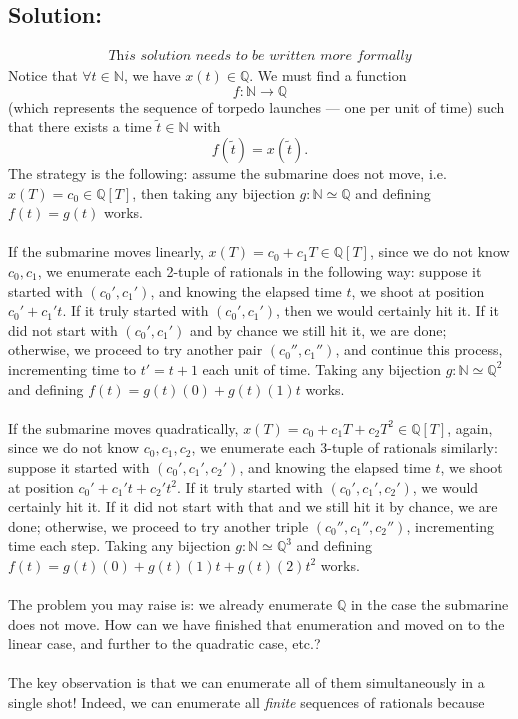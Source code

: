\documentclass[11pt, a4paper, oneside]{article}
\newcommand{\solution}[1][]{\subsection*{#1}\hfill \par}
\theoremstyle{remark}
\theoremstyle{lemma}
\begin{document}
\solution[Solution:]
\[
\substack{\textit{This solution needs to be written more formally}}
\]
Notice that \(\forall t \in \mathbb{N}\), we have \(x(t) \in \mathbb{Q}\). We must find a function
\[
f: \mathbb{N} \rightarrow \mathbb{Q}
\]
(which represents the sequence of torpedo launches — one per unit of time) such that there exists a time \(\tilde{t} \in \mathbb{N}\) with
\[
f(\tilde{t}) = x(\tilde{t}).
\]
The strategy is the following: assume the submarine does not move, i.e. \(x(T) = c_0 \in \mathbb{Q}[T]\), then taking any bijection \(g: \mathbb{N} \simeq \mathbb{Q}\) and defining \(f(t) = g(t)\) works.
\\\\
If the submarine moves linearly, \(x(T) = c_0 + c_1 T \in \mathbb{Q}[T]\), since we do not know \(c_0, c_1\), we enumerate each 2-tuple of rationals in the following way: suppose it started with \((c_0', c_1')\), and knowing the elapsed time \(t\), we shoot at position \(c_0' + c_1' t\). If it truly started with \((c_0', c_1')\), then we would certainly hit it. If it did not start with \((c_0', c_1')\) and by chance we still hit it, we are done; otherwise, we proceed to try another pair \((c_0'', c_1'')\), and continue this process, incrementing time to \(t' = t + 1\) each unit of time. Taking any bijection \(g: \mathbb{N} \simeq \mathbb{Q}^{2}\) and defining \(f(t) = g(t)(0)+g(t)(1)t\) works.
\\\\
If the submarine moves quadratically, \(x(T) = c_0 + c_1 T + c_2 T^2 \in \mathbb{Q}[T]\), again, since we do not know \(c_0, c_1, c_2\), we enumerate each 3-tuple of rationals similarly: suppose it started with \((c_0', c_1', c_2')\), and knowing the elapsed time \(t\), we shoot at position \(c_0' + c_1' t + c_2' t^2\). If it truly started with \((c_0', c_1', c_2')\), we would certainly hit it. If it did not start with that and we still hit it by chance, we are done; otherwise, we proceed to try another triple \((c_0'', c_1'', c_2'')\), incrementing time each step. Taking any bijection \(g: \mathbb{N} \simeq \mathbb{Q}^{3}\) and defining \(f(t) = g(t)(0)+g(t)(1)t+g(t)(2)t^2\) works.
\\\\
The problem you may raise is: we already enumerate \(\mathbb{Q}\) in the case the submarine does not move. How can we have finished that enumeration and moved on to the linear case, and further to the quadratic case, etc.?
\\\\
The key observation is that we can enumerate all of them simultaneously in a single shot! Indeed, we can enumerate all \textit{finite} sequences of rationals because
\end{document}
